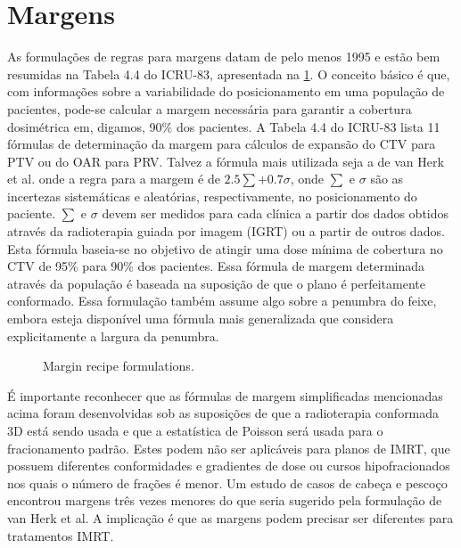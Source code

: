 \documentclass[11pt,a4paper]{article}
\begin{document}
\section{Margens}

	As formulações de regras para margens datam de pelo menos 1995 e estão bem resumidas na Tabela 4.4 do ICRU-83, apresentada na \ref{fig:margensIcru83}. O conceito básico é que, com informações sobre a variabilidade do posicionamento em uma população de pacientes, pode-se calcular a margem necessária para garantir a cobertura dosimétrica em, digamos, 90\% dos pacientes. A Tabela 4.4 do ICRU-83 lista 11 fórmulas de determinação da margem para cálculos de expansão do CTV para PTV ou do OAR para PRV. Talvez a fórmula mais utilizada seja a de van Herk et al. onde a regra para a margem é de $2.5\sum + 0.7\sigma$, onde $\sum$ e $\sigma$ são as incertezas sistemáticas e aleatórias, respectivamente, no posicionamento do paciente. $\sum$ e $\sigma$ devem ser medidos para cada clínica a partir dos dados obtidos através da radioterapia guiada por imagem (IGRT) ou a partir de outros dados. Esta fórmula baseia-se no objetivo de atingir uma dose mínima de cobertura no CTV de 95\% para 90\% dos pacientes. Essa fórmula de margem determinada através da população é baseada na suposição de que o plano é perfeitamente conformado. Essa formulação também assume algo sobre a penumbra do feixe, embora esteja disponível uma fórmula mais generalizada que considera explicitamente a largura da penumbra.

	\begin{figure}[h]
		\centering
		\caption{Margin recipe formulations.}
		\label{fig:margensIcru83}
	\end{figure}
	

	É importante reconhecer que as fórmulas de margem simplificadas mencionadas acima foram desenvolvidas sob as suposições de que a radioterapia conformada 3D está sendo usada e que a estatística de Poisson será usada para o fracionamento padrão. Estes podem não ser aplicáveis para planos de IMRT, que possuem diferentes conformidades e gradientes de dose ou cursos hipofracionados nos quais o número de frações é menor. Um estudo de casos de cabeça e pescoço encontrou margens três vezes menores do que seria sugerido pela formulação de van Herk et al. A implicação é que as margens podem precisar ser diferentes para tratamentos IMRT.
\end{document}
